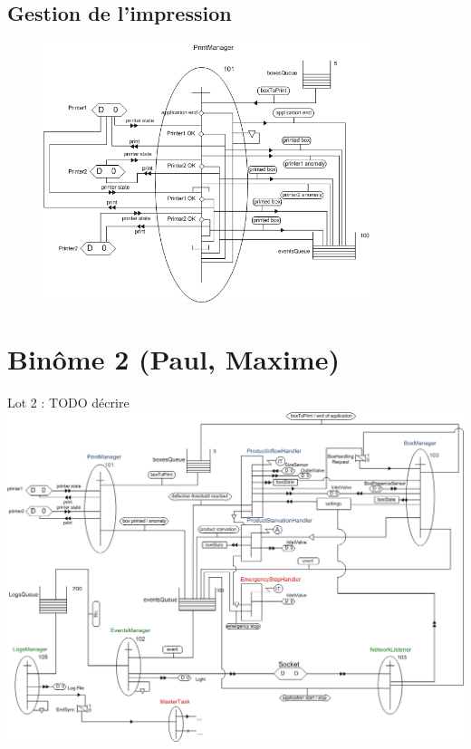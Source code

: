 \documentclass{beamer}
\begin{document}
\subsection{Gestion de l'impression}
	\begin{frame}
	\begin{figure}
		\centering
		\includegraphics[width=0.85\textwidth]{../../SchemasLCG/PrintManager.png}
	\end{figure}
	\end{frame}

\section{Binôme 2 (Paul, Maxime)}
	\begin{frame}
	\begin{center}
		\huge Lot 2 : TODO décrire
		\includegraphics[height=0.8\textheight]{../../SchemasLCG/schemaGlobal.png}
	\end{center}
	\end{frame}
\end{document}
